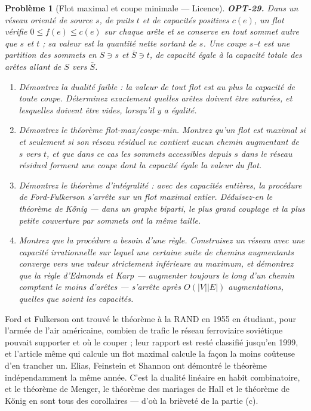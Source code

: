 \documentclass[11pt]{article}
\newtheorem{problem}{Problème}
\begin{document}
\begin{problem}[{Flot maximal et coupe minimale --- Licence}]
\textbf{OPT-29.} Dans un réseau orienté de source $s$, de puits $t$ et de capacités positives
$c(e)$, un \textit{flot} vérifie $0 \le f(e) \le c(e)$ sur chaque arête et se conserve en tout
sommet autre que $s$ et $t$ ; sa valeur est la quantité nette sortant de $s$. Une
\textit{coupe} $s$--$t$ est une partition des sommets en $S \ni s$ et $\bar S \ni t$, de capacité
égale à la capacité totale des arêtes allant de $S$ vers $\bar S$.
\begin{enumerate}
\item[(a)] Démontrez la dualité faible : la valeur de tout flot est au plus la capacité de toute coupe.
Déterminez exactement quelles arêtes doivent être saturées, et lesquelles doivent être vides,
lorsqu'il y a égalité.
\item[(b)] Démontrez le théorème flot-max/coupe-min. Montrez qu'un flot est maximal si et seulement si son
réseau résiduel ne contient aucun chemin augmentant de $s$ vers $t$, et que dans ce cas les
sommets accessibles depuis $s$ dans le réseau résiduel forment une coupe dont la capacité égale la
valeur du flot.
\item[(c)] Démontrez le théorème d'intégralité : avec des capacités entières, la procédure de Ford-Fulkerson
s'arrête sur un flot maximal entier. Déduisez-en le théorème de K\H{o}nig --- dans un graphe biparti, le
plus grand couplage et la plus petite couverture par sommets ont la même taille.
\item[(d)] Montrez que la procédure a besoin d'une règle. Construisez un réseau avec une capacité
irrationnelle sur lequel une certaine suite de chemins augmentants converge vers une valeur
strictement inférieure au maximum, et démontrez que la règle d'Edmonds et Karp --- augmenter toujours
le long d'un chemin comptant le moins d'arêtes --- s'arrête après $O(|V||E|)$ augmentations, quelles
que soient les capacités.
\end{enumerate}

\end{problem}

\noindent Ford et Fulkerson ont trouvé le théorème à la RAND en 1955 en étudiant, pour
l'armée de l'air américaine, combien de trafic le réseau ferroviaire soviétique pouvait supporter et
où le couper ; leur rapport est resté classifié jusqu'en 1999, et l'article même qui calcule un flot
maximal calcule la façon la moins coûteuse d'en trancher un. Elias, Feinstein et Shannon ont démontré
le théorème indépendamment la même année. C'est la dualité linéaire en habit combinatoire, et le
théorème de Menger, le théorème des mariages de Hall et le théorème de K\H{o}nig en sont tous des
corollaires --- d'où la brièveté de la partie (c).
\end{document}
